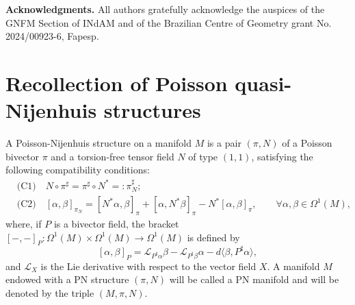 \documentclass[12pt]{article}
\begin{document}
\par\bigskip\noindent
{\bf Acknowledgments.} 
All authors gratefully acknowledge the auspices of the GNFM Section of INdAM and of the Brazilian Centre of Geometry grant No. 2024/00923-6, Fapesp.


\section{Recollection of Poisson quasi-Nijenhuis structures}\label{sec:2}

A Poisson-Nijenhuis structure on a manifold $M$ is a pair $(\pi,N)$ of a Poisson bivector  $\pi$ and a torsion-free tensor field $N$ of type $(1,1)$, satisfying the following compatibility conditions: 
\begin{equation}
\label{eq:pncon}
\begin{aligned}
&\mbox{(C1)}\quad N\circ\pi^\sharp=\pi^\sharp\circ N^\ast=:\pi^\sharp_N;%
\\
&\mbox{(C2)}\quad[\alpha,\beta]_{\pi_N}=[N^\ast\alpha,\beta]_{\pi}+[\alpha,N^\ast\beta]_{\pi}-N^\ast[\alpha,\beta]_{\pi},\qquad\forall\alpha,\beta\in\Omega^1(M),
\end{aligned}
\end{equation}
where, if $P$ is a bivector field, 
the bracket $[-,-]_P:\Omega^1(M)\times\Omega^1(M)\rightarrow\Omega^1(M)$ is defined by 
\[
[\alpha,\beta]_P=\mathcal L_{P^\sharp\alpha}\beta
-\mathcal L_{P^\sharp\beta}\alpha-d\langle\beta,P^\sharp\alpha\rangle,
\]
and $\mathcal L_X$ is the Lie derivative with respect to the vector field $X$. A manifold $M$ endowed 
with a PN structure $(\pi,N)$ will be called a PN manifold and will be denoted by the triple $(M,\pi,N)$. 
\end{document}
